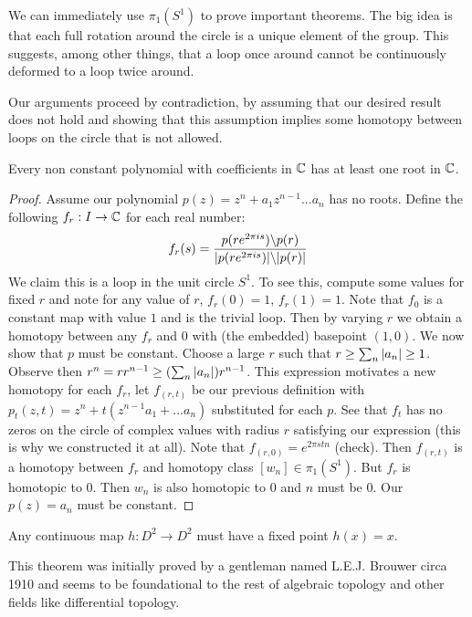 \documentclass[10pt]{article}
\begin{document}
We can immediately use $\pi_1(S^1)$ to prove important theorems. The big idea is that each full rotation around the circle is a unique element of the group. This suggests, among other things, that a loop once around cannot be continuously deformed to a loop twice around.

Our arguments proceed by contradiction, by assuming that our desired result does not hold and showing that this assumption implies some homotopy between loops on the circle that is not allowed.

\begin{theorem}
Every non constant polynomial with coefficients in $\mathbb{C}$ has at least one root in $\mathbb{C}$.
\end{theorem}

\begin{proof}
	Assume our polynomial $p(z) = z^n + a_1z^{n-1} ... a_n$ has no roots.
	Define the following $f_r: I \to \mathbb{C}$ for each real number:
	\[
		f_r(s) = \frac{p(re^{2\pi is}) \backslash p(r)}{\lvert p(re^{2\pi is})\rvert \backslash \lvert p(r)\rvert}
	\]
	We claim this is a loop in the unit circle $S^1$. To see this, compute some values for fixed $r$ and note for any value of $r$, $f_r(0) = 1$, $f_r(1) = 1$.
	Note that $f_0$ is a constant map with value $1$ and is the trivial loop. Then by varying $r$ we obtain a homotopy between any $f_r$ and $0$ with (the embedded) basepoint $(1, 0)$.
	\indent We now show that $p$ must be constant. Choose a large $r$ such that $r \geq \sum_n{\lvert a_n\rvert} \geq 1$. Observe then $r^n = rr^{n-1} \geq (\sum_n{\lvert a_n\rvert})r^{n-1}$.
	This expression motivates a new homotopy for each $f_r$, let $f_{(r, t)}$ be our previous definition with $p_t(z, t) = z^n + t(z^{n-1}a_1 + ... a_n)$ substituted for each $p$. See that $f_t$ has no zeros on the circle of complex values with radius $r$ satisfying our expression (this is why we constructed it at all).
	Note that $f_{(r, 0)} = e^{2\pi stn}$ (check). Then $f_{(r, t)}$ is a homotopy between $f_r$ and homotopy class $[w_n] \in \pi_1(S^1)$.  But $f_r$ is homotopic to $0$. Then $w_n$ is also homotopic to $0$ and $n$ must be 0. Our $p(z) = a_n$ must be constant.
\end{proof}

\begin{theorem}
	Any continuous map $h: D^2 \to D^2$ must have a fixed point $h(x) = x$.
\end{theorem}

This theorem was initially proved by a gentleman named L.E.J. Brouwer circa 1910 and seems to be foundational to the rest of algebraic topology and other fields like differential topology.
\end{document}
